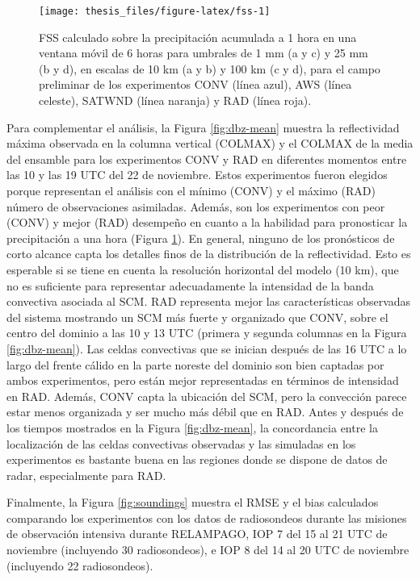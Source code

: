 \documentclass[12pt,oneside,a4paper]{reedthesis}
\begin{document}
\begin{figure}
\texttt{[image: thesis\_files/figure-latex/fss-1]} \caption{FSS calculado sobre la precipitación acumulada a 1 hora en una ventana móvil de 6 horas para umbrales de 1 mm (a y c) y 25 mm (b y d), en escalas de 10 km (a y b) y 100 km (c y d), para el campo preliminar de los experimentos CONV (línea azul), AWS (línea celeste), SATWND (línea naranja) y RAD (línea roja).}\label{fig:fss}
\end{figure}
Para complementar el análisis, la Figura \ref{fig:dbz-mean} muestra la reflectividad máxima observada en la columna vertical (COLMAX) y el COLMAX de la media del ensamble para los experimentos CONV y RAD en diferentes momentos entre las 10 y las 19 UTC del 22 de noviembre. Estos experimentos fueron elegidos porque representan el análisis con el mínimo (CONV) y el máximo (RAD) número de observaciones asimiladas. Además, son los experimentos con peor (CONV) y mejor (RAD) desempeño en cuanto a la habilidad para pronosticar la precipitación a una hora (Figura \ref{fig:fss}). En general, ninguno de los pronósticos de corto alcance capta los detalles finos de la distribución de la reflectividad. Esto es esperable si se tiene en cuenta la resolución horizontal del modelo (10 km), que no es suficiente para representar adecuadamente la intensidad de la banda convectiva asociada al SCM. RAD representa mejor las características observadas del sistema mostrando un SCM más fuerte y organizado que CONV, sobre el centro del dominio a las 10 y 13 UTC (primera y segunda columnas en la Figura \ref{fig:dbz-mean}). Las celdas convectivas que se inician después de las 16 UTC a lo largo del frente cálido en la parte noreste del dominio son bien captadas por ambos experimentos, pero están mejor representadas en términos de intensidad en RAD. Además, CONV capta la ubicación del SCM, pero la convección parece estar menos organizada y ser mucho más débil que en RAD. Antes y después de los tiempos mostrados en la Figura \ref{fig:dbz-mean}, la concordancia entre la localización de las celdas convectivas observadas y las simuladas en los experimentos es bastante buena en las regiones donde se dispone de datos de radar, especialmente para RAD.

Finalmente, la Figura \ref{fig:soundings} muestra el RMSE y el bias calculados comparando los experimentos con los datos de radiosondeos durante las misiones de observación intensiva durante RELAMPAGO, IOP 7 del 15 al 21 UTC de noviembre (incluyendo 30 radiosondeos), e IOP 8 del 14 al 20 UTC de noviembre (incluyendo 22 radiosondeos).
\end{document}
